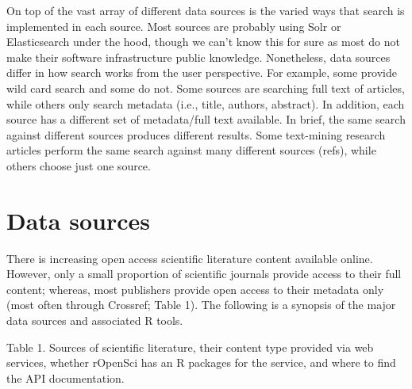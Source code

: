 \documentclass[author-year, review, 11pt]{components/elsarticle} %
\begin{document}
On top of the vast array of different data sources is the varied ways
that search is implemented in each source. Most sources are probably
using Solr or Elasticsearch under the hood, though we can't know this
for sure as most do not make their software infrastructure public
knowledge. Nonetheless, data sources differ in how search works from the
user perspective. For example, some provide wild card search and some do
not. Some sources are searching full text of articles, while others only
search metadata (i.e., title, authors, abstract). In addition, each
source has a different set of metadata/full text available. In brief,
the same search against different sources produces different results.
Some text-mining research articles perform the same search against many
different sources (refs), while others choose just one source.

\hypertarget{data-sources}{%
\section{Data sources}\label{data-sources}}

There is increasing open access scientific literature content available
online. However, only a small proportion of scientific journals provide
access to their full content; whereas, most publishers provide open
access to their metadata only (most often through Crossref; Table 1).
The following is a synopsis of the major data sources and associated R
tools.

\newpage

Table 1. Sources of scientific literature, their content type provided
via web services, whether rOpenSci has an R packages for the service,
and where to find the API documentation.
\end{document}
